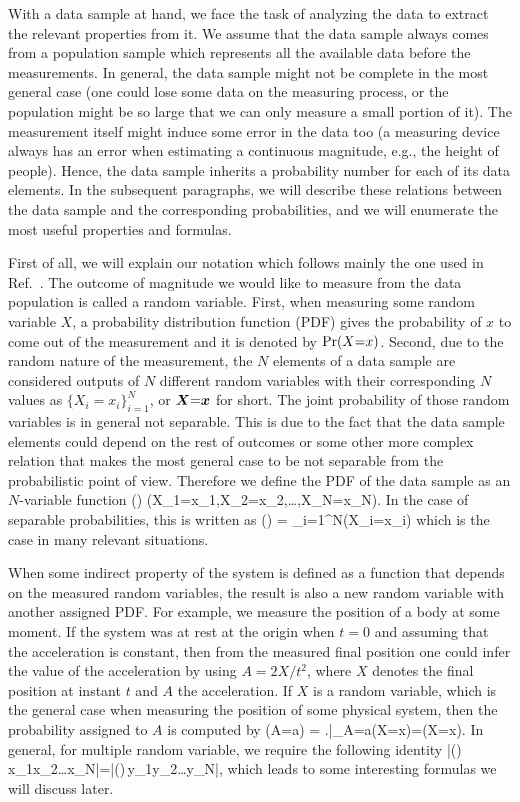 With a data sample at hand, we face the task of analyzing the data to extract the relevant properties from it.
We assume that the data sample always comes from a population sample which represents all the available data before the measurements.
In general, the data sample might not be complete in the most general case (one could lose some data on the measuring process, or the population might be so large that we can only measure a small portion of it).
The measurement itself might induce some error in the data too (a measuring device always has an error when estimating a continuous magnitude, e.g., the height of people).
Hence, the data sample inherits a probability number for each of its data elements.
In the subsequent paragraphs, we will describe these relations between the data sample and the corresponding probabilities, and we will enumerate the most useful properties and formulas.

First of all, we will explain our notation which follows mainly the one used in Ref.~\cite{Riley2006}.
The outcome of magnitude we would like to measure from the data population is called a random variable.
First, when measuring some random variable $X$, a probability distribution function (PDF) gives the probability of $x$ to come out of the measurement and it is denoted by $\text{Pr}(X{=}x)$.
Second, due to the random nature of the measurement, the $N$ elements of a data sample are considered outputs of $N$ different random variables with their corresponding $N$ values as $\{X_i{=}x_i\}_{i=1}^N$, or $\boldsymbol{X}{=}\boldsymbol{x}$ for short.
The joint probability of those random variables is in general not separable.
This is due to the fact that the data sample elements could depend on the rest of outcomes or some other more complex relation that makes the most general case to be not separable from the probabilistic point of view.
Therefore we define the PDF of the data sample as an $N$-variable function
\be
  \prob() \equiv \prob(X_1{=}x_1,X_2{=}x_2,\dots,X_N{=}x_N).
\ee
In the case of separable probabilities, this is written as
\be
  \label{eq:bg-separable-likelyhood}
  \prob() = \prod_{i=1}^N\prob(X_i{=}x_i)
\ee
which is the case in many relevant situations.

When some indirect property of the system is defined as a function that depends on the measured random variables, the result is also a new random variable with another assigned PDF.
For example, we measure the position of a body at some moment.
If the system was at rest at the origin when $t=0$ and assuming that the acceleration is constant, then from the measured final position one could infer the value of the acceleration by using $A=2X/t^2$, where $X$ denotes the final position at instant $t$ and $A$ the acceleration.
If $X$ is a random variable, which is the general case when measuring the position of some physical system, then the probability assigned to $A$ is computed by
\be
  \prob(A{=}a) = \left.\right|_{A=a}\prob(X{=}x)=\prob(X{=}x).
\ee
In general, for multiple random variable, we require the following identity
\be
  |\prob()\,x_1x_2\dots{}x_N|=|\prob()\,y_1y_2\dots{}y_N|,
\ee
which leads to some interesting formulas we will discuss later.

